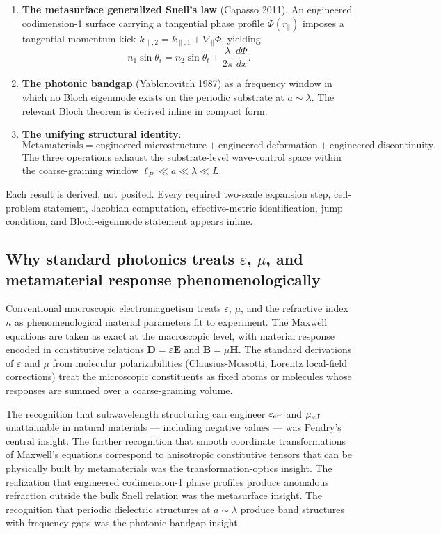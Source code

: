 \documentclass[11pt,a4paper]{article}
\begin{document}
\begin{enumerate}[noitemsep]
\item \textbf{The metasurface generalized Snell's law} (Capasso 2011). An engineered codimension-1 surface carrying a tangential phase profile $\Phi(r_\parallel)$ imposes a tangential momentum kick $k_{\parallel,2} = k_{\parallel,1} + \nabla_\parallel\Phi$, yielding
\[
n_1 \sin\theta_i = n_2 \sin\theta_t + \frac{\lambda}{2\pi}\,\frac{d\Phi}{dx}.
\]
\item \textbf{The photonic bandgap} (Yablonovitch 1987) as a frequency window in which no Bloch eigenmode exists on the periodic substrate at $a \sim \lambda$. The relevant Bloch theorem is derived inline in compact form.
\item \textbf{The unifying structural identity}:
\[
\text{Metamaterials} = \text{engineered microstructure} + \text{engineered deformation} + \text{engineered discontinuity}.
\]
The three operations exhaust the substrate-level wave-control space within the coarse-graining window $\ell_P \ll a \ll \lambda \ll L$.
\end{enumerate}

Each result is derived, not posited. Every required two-scale expansion step, cell-problem statement, Jacobian computation, effective-metric identification, jump condition, and Bloch-eigenmode statement appears inline.

\subsection{Why standard photonics treats $\varepsilon$, $\mu$, and metamaterial response phenomenologically}

Conventional macroscopic electromagnetism treats $\varepsilon$, $\mu$, and the refractive index $n$ as phenomenological material parameters fit to experiment. The Maxwell equations are taken as exact at the macroscopic level, with material response encoded in constitutive relations $\mathbf{D} = \varepsilon\mathbf{E}$ and $\mathbf{B} = \mu\mathbf{H}$. The standard derivations of $\varepsilon$ and $\mu$ from molecular polarizabilities (Clausius-Mossotti, Lorentz local-field corrections) treat the microscopic constituents as fixed atoms or molecules whose responses are summed over a coarse-graining volume.

The recognition that subwavelength structuring can engineer $\varepsilon_{\rm eff}$ and $\mu_{\rm eff}$ unattainable in natural materials --- including negative values --- was Pendry's central insight. The further recognition that smooth coordinate transformations of Maxwell's equations correspond to anisotropic constitutive tensors that can be physically built by metamaterials was the transformation-optics insight. The realization that engineered codimension-1 phase profiles produce anomalous refraction outside the bulk Snell relation was the metasurface insight. The recognition that periodic dielectric structures at $a \sim \lambda$ produce band structures with frequency gaps was the photonic-bandgap insight.
\end{document}
